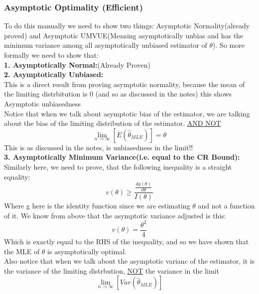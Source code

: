 \documentclass[12pt]{article}
\begin{document}
\subsubsection*{Asymptotic Optimality (Efficient)}
To do this manually we need to show two things: Asymptotic Normality(already proved) and Asymptotic UMVUE(Meaning asymptotically unbias and has the minimum variance among all asymptotically unbiased estimator of $\theta$). So more formally we need to show that:\\
\textbf{1. Asymptotically Normal:}(Already Proven)\\
\textbf{2. Asymptotically Unbiased:}\\
This is a direct result from proving asymptotic normality, because the mean of the limiting distrbitution is 0 (and so as discussed in the notes) this shows Asymptotic unbiasedness\\
Notice that when we talk about asymptotic bias of the estimator, we are talking about the bias of the limiting distribution of the estimator. \underline{AND NOT}
\[
\lim_{n\to \infty}[E(\hat{\theta}_{MLE})] = \theta
\]
This is as discussed in the notes, is unbiasedness in the limit!! \\
\textbf{3. Asymptotically Minimum Variance(i.e. equal to the CR Bound):}\\
Similarly here, we need to prove, that the following inequality is a straight equality: 
\[
v(\theta)\geq \frac{\frac{dg(\theta)}{d\theta}}{I(\theta)}
\]
Where g here is the identity function since we are estimating $\theta$ and not a function of it. We know from above that the asymptotic variance adjusted is this:
\[
v(\theta) = \frac{\theta^2}{4} 
\]
Which is exactly equal to the RHS of the inequality, and so we have shown that the MLE of $\theta$ is asymptotically optimal.\\
Also notice that when we talk about the asymptotic varianc of the estimator, it is the variance of the limiting distrbution, \underline{NOT} the variance in the limit 
\[ 
\lim_{n\to \infty}[Var(\hat{\theta}_{MLE})]
\]
\end{document}
